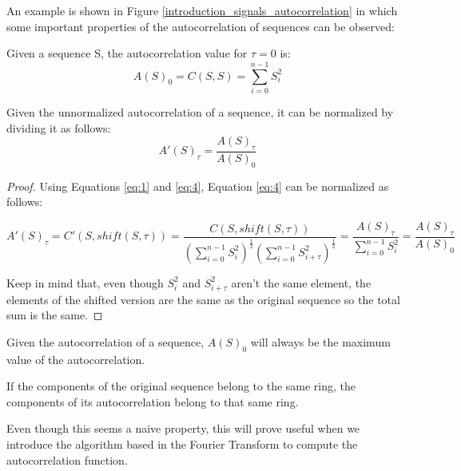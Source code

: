 An example  is shown in Figure
\ref{introduction_signals_autocorrelation} in which some important properties of
the autocorrelation of sequences can be observed:

\begin{theorem}\label{theorem:1.2.1}
  Given a sequence S, the autocorrelation value for $\tau = 0$ is:
    \begin{equation}
      A(S)_{0}=C(S, S)=\sum_{i=0}^{n-1}S_{i}^2
    \end{equation}
\end{theorem}

\begin{corollary}
  Given the unnormalized autocorrelation of a sequence, it can be normalized
  by dividing it as follows:
  \begin{equation}
    A'(S)_{\tau} = \frac{A(S)_{\tau}}{A(S)_{0}}
  \end{equation}
\end{corollary}

\begin{proof}
  Using Equations \eqref{eq:1} and \eqref{eq:4}, Equation \eqref{eq:4} can be
  normalized as follows:

    $$A'(S)_{\tau} = C'(S, shift(S, \tau)) = \frac{C(S, shift(S, \tau))}{(\sum_{i=0}^{n-1} S_{i}^{2})^{\frac{1}{2}}(\sum_{i=0}^{n-1} S_{i+\tau}^{2})^\frac{1}{2}} = \frac{A(S)_{\tau}}{\sum_{i=0}^{n-1} S_{i}^{2}} = \frac{A(S)_{\tau}}{A(S)_{0}}$$

  Keep in mind that, even though $S_{i}^2$ and $S_{i+\tau}^2$ aren't the same
  element, the elements of the shifted version are the same as the original
  sequence so the total sum is the same.
\end{proof}

\begin{corollary}\label{autocorrelation:coro:1}
  Given the autocorrelation of a sequence, $A(S)_{0}$ will always be the
  maximum value of the autocorrelation.
\end{corollary}

\begin{property}\label{autocorrelation:prop:1}

  If the components of the original sequence belong to the same ring, the
  components of its autocorrelation belong to that same ring.

\end{property}

Even though this seems a naive property, this will prove
useful when we introduce the algorithm based in the Fourier Transform to
compute the autocorrelation function.









